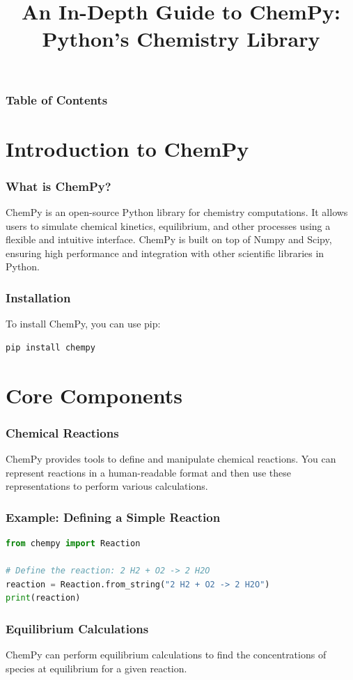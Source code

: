 \documentclass[aspectratio=169]{beamer}
\title{An In-Depth Guide to ChemPy: Python's Chemistry Library}
\author{}
\date{}
\begin{document}
\frame{\titlepage}

\begin{frame}
    \frametitle{Table of Contents}
    \tableofcontents
\end{frame}

\section{Introduction to ChemPy}

\begin{frame}
    \frametitle{What is ChemPy?}
    ChemPy is an open-source Python library for chemistry computations. It allows users to simulate chemical kinetics, equilibrium, and other processes using a flexible and intuitive interface. ChemPy is built on top of Numpy and Scipy, ensuring high performance and integration with other scientific libraries in Python.
\end{frame}

\begin{frame}[fragile]
    \frametitle{Installation}
    To install ChemPy, you can use pip:
    \begin{lstlisting}[language=bash]
pip install chempy
    \end{lstlisting}
\end{frame}

\section{Core Components}

\begin{frame}[fragile]
    \frametitle{Chemical Reactions}
    ChemPy provides tools to define and manipulate chemical reactions. You can represent reactions in a human-readable format and then use these representations to perform various calculations.
\end{frame}

\begin{frame}[fragile]
    \frametitle{Example: Defining a Simple Reaction}
    \begin{lstlisting}[language=python]
from chempy import Reaction

# Define the reaction: 2 H2 + O2 -> 2 H2O
reaction = Reaction.from_string("2 H2 + O2 -> 2 H2O")
print(reaction)
    \end{lstlisting}
\end{frame}

\begin{frame}
    \frametitle{Equilibrium Calculations}
    ChemPy can perform equilibrium calculations to find the concentrations of species at equilibrium for a given reaction.
\end{frame}
\end{document}
